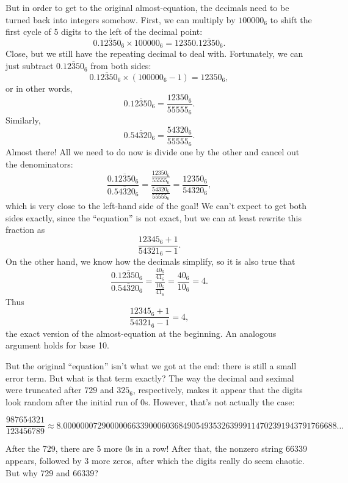 \documentclass{article}
\begin{document}
But in order to get to the original almost-equation,
the decimals need to be turned back into integers somehow.
First, we can multiply by $100000_6$
to shift the first cycle of 5 digits to the left of the decimal point:
\[0.\overline{12350}_6 \times 100000_6 = 12350.\overline{12350}_6.\]
Close, but we still have the repeating decimal to deal with.
Fortunately, we can just subtract $0.\overline{12350}_6$ from both sides:
\[0.\overline{12350}_6 \times (100000_6-1) = 12350_6,\]
or in other words,
\[0.\overline{12350}_6 = \frac{12350_6}{55555_6}.\]
Similarly,
\[0.\overline{54320}_6 = \frac{54320_6}{55555_6}.\]
Almost there! All we need to do now is divide one by the other
and cancel out the denominators:
\[\frac{0.\overline{12350}_6}{0.\overline{54320}_6}=
\frac{\frac{12350_6}{55555_6}}{\frac{54320_6}{55555_6}}
=\frac{12350_6}{54320_6},\]
which is very close to the left-hand side of the goal!
We can't expect to get both sides exactly,
since the ``equation'' is not exact,
but we can at least rewrite this fraction as
\[\frac{12345_6+1}{54321_6-1}.\]
On the other hand,
we know how the decimals simplify,
so it is also true that
\[\frac{0.\overline{12350}_6}{0.\overline{54320}_6}
=\frac{\frac{40_6}{41_6}}{\frac{10_6}{41_6}}=\frac{40_6}{10_6}=4.\]
Thus
\[\frac{12345_6+1}{54321_6-1}=4,\]
the exact version of the almost-equation at the beginning.
An analogous argument holds for base 10.

\newpage

But the original ``equation'' isn't what we got at the end:
there is still a small error term.
But what is that term exactly?
The way the decimal and seximal were truncated after $729$ and $325_6$, respectively,
makes it appear that the digits look random after the initial run of 0s.
However, that's not actually the case:

\[\frac{987654321}{123456789} \approx 8.0000000729000006633900060368490549353263999114702391943791766688\ldots\]

After the 729, there are 5 more 0s in a row!
After that, the nonzero string 66339 appears,
followed by 3 more zeros,
after which the digits really do seem chaotic.
But why 729 and 66339?


\end{document}

